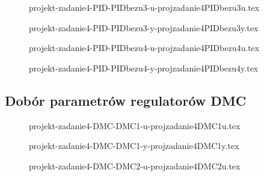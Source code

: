\begin{figure}[H] 
    \centering
    
    \caption{projekt-zadanie4-PID-PIDbezu3-u-projzadanie4PIDbezu3u.tex}
    \label{projekt:zad4:figure:projzadanie4PIDbezu3u}
\end{figure}

\begin{figure}[H] 
    \centering
    
    \caption{projekt-zadanie4-PID-PIDbezu3-y-projzadanie4PIDbezu3y.tex}
    \label{projekt:zad4:figure:projzadanie4PIDbezu3y}
\end{figure}

\begin{figure}[H] 
    \centering
    
    \caption{projekt-zadanie4-PID-PIDbezu4-u-projzadanie4PIDbezu4u.tex}
    \label{projekt:zad4:figure:projzadanie4PIDbezu4u}
\end{figure}

\begin{figure}[H] 
    \centering
    
    \caption{projekt-zadanie4-PID-PIDbezu4-y-projzadanie4PIDbezu4y.tex}
    \label{projekt:zad4:figure:projzadanie4PIDbezu4y}
\end{figure}

\subsection{Dobór parametrów regulatorów DMC}



\begin{figure}[H] 
    \centering
    
    \caption{projekt-zadanie4-DMC-DMC1-u-projzadanie4DMC1u.tex}
    \label{projekt:zad4:figure:projzadanie4DMC1u}
\end{figure}

\begin{figure}[H] 
    \centering
    
    \caption{projekt-zadanie4-DMC-DMC1-y-projzadanie4DMC1y.tex}
    \label{projekt:zad4:figure:projzadanie4DMC1y}
\end{figure}

\begin{figure}[H] 
    \centering
    
    \caption{projekt-zadanie4-DMC-DMC2-u-projzadanie4DMC2u.tex}
    \label{projekt:zad4:figure:projzadanie4DMC2u}
\end{figure}

